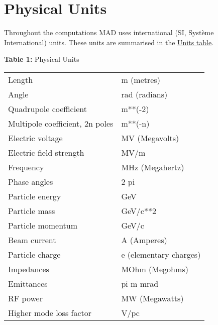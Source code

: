
\section{Physical Units}

Throughout the computations MAD uses international (SI, Syst\`eme
International) units. These units are summarised in the
\hyperlink{table}{Units table}.  

\begin{table}[h]
  \begin{center}
    {\textbf{Table 1:} Physical Units} \\
    \begin{tabular}{|l | l|}
      Length                  & m (metres) \\ 
      Angle                   & rad (radians) \\ 
      Quadrupole coefficient  & m**(-2) \\ 
      Multipole coefficient, 2n poles   & m**(-n) \\ 
      Electric voltage        & MV (Megavolts) \\ 
      Electric field strength & MV/m \\ 
      Frequency               & MHz (Megahertz) \\ 
      Phase angles            & 2 pi \\ 
      Particle energy         & GeV \\ 
      Particle mass           & GeV/c**2 \\ 
      Particle momentum       & GeV/c \\ 
      Beam current            & A (Amperes) \\ 
      Particle charge         & e (elementary charges) \\ 
      Impedances              & MOhm (Megohms) \\ 
      Emittances              & pi m mrad \\ 
      RF power                & MW (Megawatts) \\ 
      Higher mode loss factor & V/pc
    \end{tabular}
  \end{center}
\end{table}


